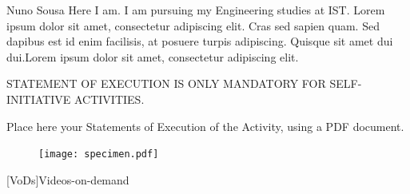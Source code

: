 \documentclass[a4paper,12pt,journal,twoside,compsoc]{PPIEEEtran}
\begin{document}
\begin{IEEEbiography}
{Nuno Sousa}
Here I am. I am pursuing my Engineering studies at \ac{IST}. Lorem ipsum dolor sit amet, consectetur adipiscing elit. Cras sed sapien quam. Sed dapibus est id enim facilisis, at posuere turpis adipiscing. Quisque sit amet dui dui.Lorem ipsum dolor sit amet, consectetur adipiscing elit. 
\end{IEEEbiography}
\newpage
\onecolumn
STATEMENT OF EXECUTION IS ONLY MANDATORY FOR SELF-INITIATIVE ACTIVITIES.

Place here your Statements of Execution of the Activity, using a PDF document.
\begin{figure}[h]
\centering
\texttt{[image: specimen.pdf]}
\end{figure}
	[VoDs]{Videos-on-demand}
	
\end{document}
